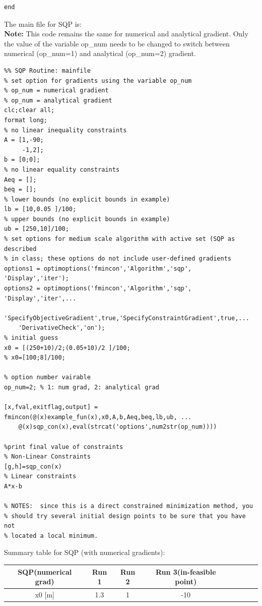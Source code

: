 \documentclass[12pt]{article}
\begin{document}
\begin{enumerate}[I]
\begin{enumerate}[1)]
\begin{lstlisting}
end
\end{lstlisting}
The main file for SQP is:\\
\textbf{Note: } This code remains the same for numerical and analytical gradient. Only the value of the variable op\_num needs to be changed to switch between numerical (op\_num=1) and analytical (op\_num=2) gradient.\\
\begin{lstlisting}
%% SQP Routine: mainfile
% set option for gradients using the variable op_num
% op_num = numerical gradient
% op_num = analytical gradient 
clc;clear all;
format long;
% no linear inequality constraints
A = [1,-90;
     -1,2];
b = [0;0];
% no linear equality constraints
Aeq = [];
beq = [];
% lower bounds (no explicit bounds in example)
lb = [10,0.05 ]/100;
% upper bounds (no explicit bounds in example)
ub = [250,10]/100;
% set options for medium scale algorithm with active set (SQP as described
% in class; these options do not include user-defined gradients
options1 = optimoptions('fmincon','Algorithm','sqp', 'Display','iter');
options2 = optimoptions('fmincon','Algorithm','sqp', 'Display','iter',...
    'SpecifyObjectiveGradient',true,'SpecifyConstraintGradient',true,...
    'DerivativeCheck','on');
% initial guess  
x0 = [(250+10)/2;(0.05+10)/2 ]/100;
% x0=[100;8]/100;

% option number vairable
op_num=2; % 1: num grad, 2: analytical grad 

[x,fval,exitflag,output] = fmincon(@(x)example_fun(x),x0,A,b,Aeq,beq,lb,ub, ...
    @(x)sqp_con(x),eval(strcat('options',num2str(op_num))))

%print final value of constraints
% Non-Linear Constraints
[g,h]=sqp_con(x)
% Linear constraints
A*x-b

% NOTES:  since this is a direct constrained minimization method, you
% should try several initial design points to be sure that you have not
% located a local minimum.
\end{lstlisting}

Summary table for SQP (with numerical gradients):\\
\begin{tabular}{|c|c|c|c|c|c|c|c|}
\hline 
SQP(numerical grad) &	Run 1 &	Run 2 &Run 3(in-feasible point)\\
\hline
x0 [m]&	1.3&	1 &-10\\


\end{tabular}
\end{enumerate}
\end{enumerate}
\end{document}
